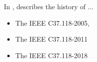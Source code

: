 In \cite{martin2013synchrophasor}, \citeauthor{martin2013synchrophasor}describes the history of ...

\begin{itemize}
    \item The IEEE C37.118-2005,
    \item The IEEE C37.118-2011
    \item The IEEE C37.118-2018
\end{itemize}

















 



